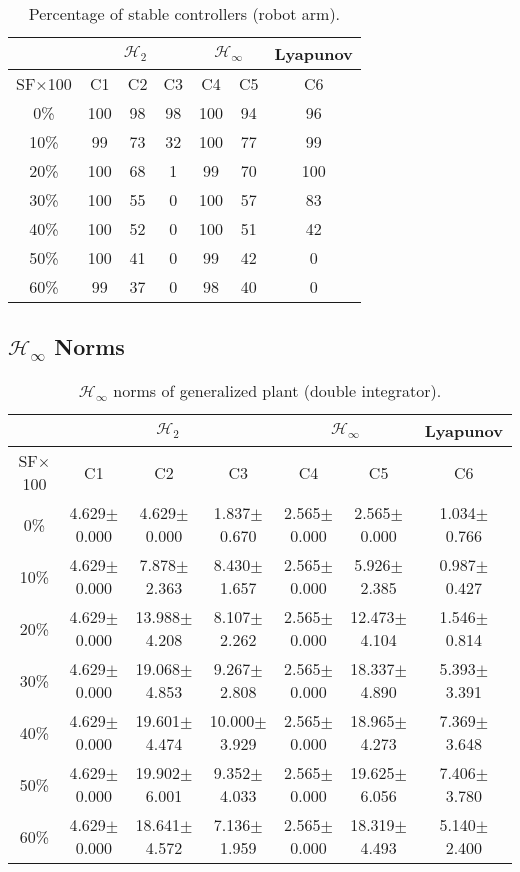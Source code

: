 \begin{table}[H]
\centering
\scriptsize
\begin{tabular}{| c || c | c | c | c | c | c |}
	\hline
	 & \multicolumn{3}{c|}{$\mathcal{H}_{2}$} & \multicolumn{2}{c|}{$\mathcal{H}_{\infty}$} & Lyapunov\\
	\hline
	SF$\times$100 & C1& C2 & C3 & C4 & C5 & C6\\
	\hline\hline
	 0\% & 100 & 98 & 98 & 100 & 94 & 96 \\
	\hline
	10\% & 99 & 73 & 32 & 100 & 77 & 99\\
	\hline
	20\% & 100 & 68 & 1 & 99 & 70 & 100\\
	\hline
	30\% & 100 & 55 & 0 & 100 & 57 & 83\\
	\hline
	40\% & 100 & 52 & 0 & 100 & 51 & 42\\
	\hline
	50\% & 100 & 41 & 0 & 99 & 42 & 0\\
	\hline
	60\% & 99 & 37 & 0 & 98 & 40 & 0\\
	\hline
\end{tabular}
\caption{Percentage of stable controllers (robot arm).}
\label{table:percent_stable_robot_arm:noise}
\end{table}

\subsection{$\mathcal{H}_{\infty}$ Norms}
\begin{table}[H]
\centering
\scriptsize
\begin{tabular}{| c || c | c | c | c | c | c |}
	\hline
	 & \multicolumn{3}{c|}{$\mathcal{H}_{2}$} & \multicolumn{2}{c|}{$\mathcal{H}_{\infty}$} & Lyapunov\\
	\hline
	SF$\times$100 & C1& C2 & C3 & C4 & C5 & C6\\
	\hline\hline
	0\% & 4.629$\pm$0.000 & 4.629$\pm$0.000 & 1.837$\pm$0.670 & 2.565$\pm$0.000 & 2.565$\pm$0.000 & 1.034$\pm$0.766\\
	\hline
	10\% & 4.629$\pm$0.000 & 7.878$\pm$2.363 & 8.430$\pm$1.657 & 2.565$\pm$0.000 & 5.926$\pm$2.385 & 0.987$\pm$0.427\\
	\hline
	20\% & 4.629$\pm$0.000 & 13.988$\pm$4.208 & 8.107$\pm$2.262 & 2.565$\pm$0.000 & 12.473$\pm$4.104 & 1.546$\pm$0.814\\
	\hline
	30\% & 4.629$\pm$0.000 & 19.068$\pm$4.853 & 9.267$\pm$2.808 & 2.565$\pm$0.000 & 18.337$\pm$4.890 & 5.393$\pm$3.391\\
	\hline
	40\% & 4.629$\pm$0.000 & 19.601$\pm$4.474 & 10.000$\pm$3.929 & 2.565$\pm$0.000 & 18.965$\pm$4.273 & 7.369$\pm$3.648\\
	\hline
	50\% & 4.629$\pm$0.000 & 19.902$\pm$6.001 & 9.352$\pm$4.033 & 2.565$\pm$0.000 & 19.625$\pm$6.056 & 7.406$\pm$3.780\\
	\hline
	60\% & 4.629$\pm$0.000 & 18.641$\pm$4.572 & 7.136$\pm$1.959 & 2.565$\pm$0.000 & 18.319$\pm$4.493 & 5.140$\pm$2.400\\
	\hline
\end{tabular}
\caption{$\mathcal{H}_{\infty}$ norms of generalized plant (double integrator).}
\label{table:hinfinity_norms_double_integrator:noise}
\end{table}

